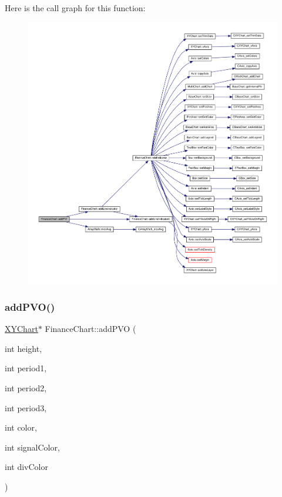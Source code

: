 Here is the call graph for this function\+:
\nopagebreak
\begin{figure}[H]
\begin{center}
\leavevmode
\includegraphics[width=350pt]{class_finance_chart_a69528f7f5ec33d01dacee72fd0fe2357_cgraph}
\end{center}
\end{figure}
\mbox{\label{class_finance_chart_ace44d0253016161a1bd17d9725fde444}} 
\subsubsection{\texorpdfstring{add\+P\+V\+O()}{addPVO()}}
{\footnotesize\ttfamily \hyperlink{class_x_y_chart}{X\+Y\+Chart}$\ast$ Finance\+Chart\+::add\+P\+VO (\begin{DoxyParamCaption}\item[{int}]{height,  }\item[{int}]{period1,  }\item[{int}]{period2,  }\item[{int}]{period3,  }\item[{int}]{color,  }\item[{int}]{signal\+Color,  }\item[{int}]{div\+Color }\end{DoxyParamCaption})\hspace{0.3cm}{\ttfamily [inline]}}



